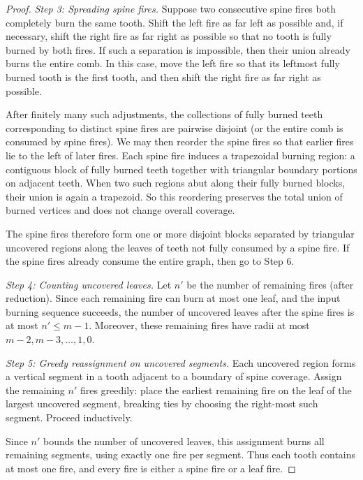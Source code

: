 \documentclass{article}
\begin{document}
\begin{proof}
\medskip
\noindent
\emph{Step 3: Spreading spine fires.}
Suppose two consecutive spine fires both completely burn the same tooth. 
Shift the left fire as far left as possible and, if necessary, shift the right fire as far right as possible so that no tooth is fully burned by both fires. If such a separation is impossible, then their union already burns the entire comb. In this case, move the left fire so that its leftmost fully burned tooth is the first tooth, and then shift the right fire as far right as possible. 

After finitely many such adjustments, the collections of fully burned teeth
corresponding to distinct spine fires are pairwise disjoint (or the entire comb is consumed by spine fires).
We may then reorder the spine fires so that earlier fires lie to the left of later fires.
Each spine fire induces a trapezoidal burning region: a contiguous block of fully burned teeth together with triangular boundary portions on adjacent teeth.
When two such regions abut along their fully burned blocks,
their union is again a trapezoid.
So this reordering preserves the total union of burned vertices and does not change overall coverage.

The spine fires therefore form one or more disjoint blocks
separated by triangular uncovered regions along the leaves of teeth not fully consumed by a spine fire. If the spine fires  already consume the entire graph, then go to Step 6.

\medskip
\noindent
\emph{Step 4: Counting uncovered leaves.}
Let $n'$ be the number of remaining fires (after reduction).
Since each remaining fire can burn at most one leaf,
and the input burning sequence succeeds,
the number of uncovered leaves after the spine fires
is at most $n' \le m-1$.
Moreover, these remaining fires have radii at most
$m-2,m-3,\dots,1,0$.

\medskip
\noindent
\emph{Step 5: Greedy reassignment on uncovered segments.}
Each uncovered region forms a vertical segment
in a tooth adjacent to a boundary of spine coverage.
Assign the remaining $n'$ fires greedily:
place the earliest remaining fire
on the leaf of the largest uncovered segment,
breaking ties by choosing the right-most such segment.
Proceed inductively.

Since $n'$ bounds the number of uncovered leaves,
this assignment burns all remaining segments,
using exactly one fire per segment.
Thus each tooth contains at most one fire,
and every fire is either a spine fire or a leaf fire.


\end{proof}
\end{document}
